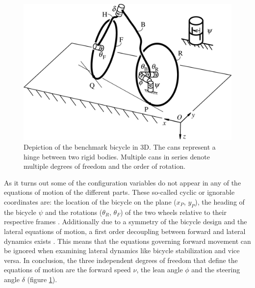 \begin{figure}[ht]
    \centering
    \captionsetup{justification=centering,margin=2cm}
    \includegraphics[scale=0.3]{images/figure3_2.png}
    \caption{Depiction of the benchmark bicycle in 3D. The cans represent a hinge between two rigid bodies. Multiple cans in series denote multiple degrees of freedom and the order of rotation.\cite{meijaard2007linearized}}
    \label{fig:figure3}
\end{figure}
\par
As it turns out some of the configuration variables do not appear in any of the equations of motion of the different parts. These so-called cyclic or ignorable coordinates are: the location of the bicycle on the plane (\ensuremath{x_{P}}, \ensuremath{y_{P}}), the heading of the bicycle \ensuremath{\psi} and the rotations (\ensuremath{\theta_{R}}, \ensuremath{\theta_{F}}) of the two wheels relative to their respective frames \cite{meijaard2007linearized}. Additionally due to a symmetry of the bicycle design and the lateral equations of motion, a  first order decoupling between forward and lateral dynamics exists \cite{meijaard2007linearized}. This means that the equations governing forward movement can be ignored when examining lateral dynamics like bicycle stabilization and vice versa. In conclusion, the three independent degrees of freedom that define the equations of motion are the  forward speed \ensuremath{\nu},  the lean angle \ensuremath{\phi} and the  steering angle \ensuremath{\delta} (figure \ref{fig:figure3}).
